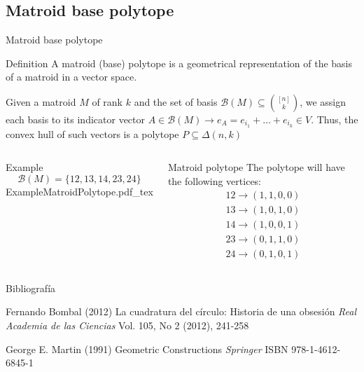 \documentclass{beamer}
\newcommand{\incfig}[1]{%
\center
\def\svgwidth{0.9\columnwidth}
{#1.pdf_tex}
}
\begin{document}
\subsection{Matroid base polytope}
\begin{frame}{Matroid base polytope}
\begin{block}{Definition}
A matroid (base) polytope is a geometrical representation of the basis of a matroid in a vector space. 

Given a matroid $M$ of rank $k$ and the set of basis $\mathcal{B}(M)\subseteq \binom{[n]}{k}$, we assign each basis to its indicator vector $A\in \mathcal{B}(M) \to e_A = e_{i_1} + \ldots + e_{i_k}\in V$. Thus, the convex hull of such vectors is a polytope $P\subseteq \Delta(n,k)$ 
\end{block}  
\begin{columns}[c]
\begin{block}{Example}
  \[
  \mathcal{B}(M) = \{12, 13, 14, 23, 24\}
  \] 
\incfig{ExampleMatroidPolytope}
\end{block}
\begin{block}{Matroid polytope}
  The polytope will have the following vertices:
  \begin{align*}
    12 \to (1, 1, 0, 0)\\
	13 \to (1, 0, 1, 0)\\
	14 \to (1, 0, 0, 1)\\
	23 \to (0, 1, 1, 0)\\
	24 \to  (0, 1, 0, 1)
  \end{align*}
\end{block}
\end{columns}

\end{frame}




\begin{frame}{Bibliografía}
\footnotesize{
\begin{thebibliography}{99} %
 Fernando Bombal (2012)
\newblock La cuadratura del círculo: Historia de una obsesión
\newblock \emph{Real Academia de las Ciencias} Vol. 105, No 2 (2012), 241-258
\end{thebibliography}

\begin{thebibliography}{99} %
 George E. Martin (1991)
\newblock Geometric Constructions
\newblock \emph{Springer} ISBN 978-1-4612-6845-1
\end{thebibliography}

}
\end{frame}

\end{document}
